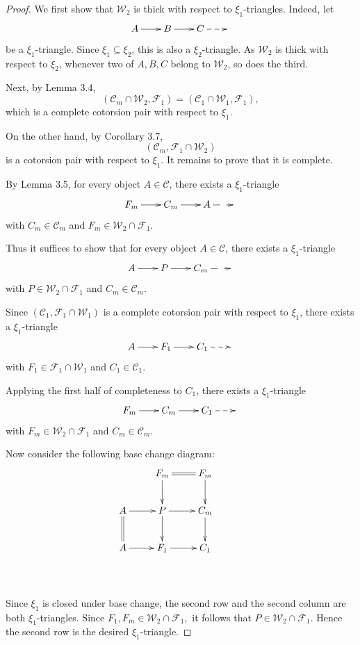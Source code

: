 \documentclass[11pt,a4paper]{amsart}
\numberwithin{equation}{section}
\theoremstyle{plain}
\begin{document}
\begin{proof}
	We first show that \(\mathcal{W}_2\) is thick with respect to \(\xi_1\)-triangles. Indeed, let
\[
\xymatrix@C=2em{
	A \ar[r] &
	B \ar[r] &
	C\ar@{-->}[r] &
	{}
}
\]
	be a \(\xi_1\)-triangle. Since \(\xi_1\subseteq\xi_2\), this is also a \(\xi_2\)-triangle. As \(\mathcal{W}_2\) is thick with respect to \(\xi_2\), whenever two of \(A,B,C\) belong to \(\mathcal{W}_2\), so does the third.
	
	Next, by Lemma 3.4,
	\[
	(\mathcal{C}_m\cap\mathcal{W}_2,\mathcal{F}_1)
	=
	(\mathcal{C}_1\cap\mathcal{W}_1,\mathcal{F}_1),
	\]
	which is a complete cotorsion pair with respect to $\xi_1$.
	
	On the other hand, by Corollary 3.7,
	\[
	(\mathcal{C}_m,\mathcal{F}_1\cap\mathcal{W}_2)
	\]
	is a cotorsion pair with respect to $\xi_1$. It remains to prove that it is complete.
	
	By Lemma 3.5, for every object \(A\in\mathscr{C}\), there exists a \(\xi_1\)-triangle
	\[
	\xymatrix@C=2em{
		F_m \ar[r] &
		C_m \ar[r] &
		A\ar@{-->}[r] &
		{}
	}
	\]
	with
	\(
	C_m\in\mathcal{C}_m
	\)
	and
	\(
	F_m\in\mathcal{W}_2\cap\mathcal{F}_1.
	\)
	
	Thus it suffices to show that for every object \(A\in\mathscr{C}\), there exists a \(\xi_1\)-triangle
	\[
\xymatrix@C=2em{
	A \ar[r] &
	P \ar[r] &
	C_m\ar@{-->}[r] &
	{}
}
\]
	with
	\(
	P\in\mathcal{W}_2\cap\mathcal{F}_1
	\)
	and
	\(
	C_m\in\mathcal{C}_m.
	\)
	
	Since
	\(
	(\mathcal{C}_1,\mathcal{F}_1\cap\mathcal{W}_1)
	\)
	is a complete cotorsion pair with respect to $\xi_1$, there exists a \(\xi_1\)-triangle
	\[
	\xymatrix@C=2em{
		A \ar[r] &
		F_1 \ar[r] &
		C_1\ar@{-->}[r] &
		{}
	}
	\]
	with
	\(
	F_1\in\mathcal{F}_1\cap\mathcal{W}_1
	\)
	and
	\(
	C_1\in\mathcal{C}_1.
	\)
	
	Applying the first half of completeness to \(C_1\), there exists a \(\xi_1\)-triangle
	\[
	\xymatrix@C=2em{
		F_m \ar[r] &
		C_m \ar[r] &
		C_1\ar@{-->}[r] &
		{}
	}
	\]
	with
	\(
	F_m\in\mathcal{W}_2\cap\mathcal{F}_1
	\)
	and
	\(
	C_m\in\mathcal{C}_m.
	\)
	
Now consider the following base change diagram:
\[
\xymatrix{
	& F_m \ar@{=}[r] \ar[d]
	& F_m \ar[d]
	&
	\\
	A \ar[r] \ar@{=}[d]
	& P \ar[r] \ar[d]
	& C_m  \ar[d]
	& 
	\\
	A \ar[r]
	& F_1 \ar[r] 
	& C_1  
	& 
	\\
	& 
	& 
	&
}
\]

Since \(\xi_1\) is closed under base change, the second row and the second column are both \(\xi_1\)-triangles. Since
\(
F_1,F_m\in\mathcal{W}_2\cap\mathcal{F}_1,
\)
it follows that
\(
P\in\mathcal{W}_2\cap\mathcal{F}_1.
\)
Hence the second row is the desired \(\xi_1\)-triangle.
	
	
	

\end{proof}
\end{document}
